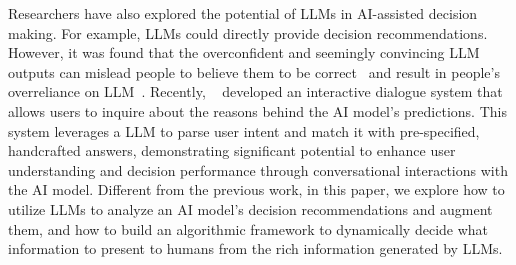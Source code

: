Researchers have also explored the potential of LLMs in AI-assisted decision making. For example, LLMs could directly provide decision recommendations. However, it was found that the 
overconfident and seemingly convincing LLM outputs can mislead people to believe them to be correct~\cite{steyvers2025large} and result in people's overreliance on LLM~\cite{do2024facilitating,kim2024m}. 
Recently, \citeauthor{slack2023explaining}~\cite{slack2023explaining} developed an interactive dialogue system that allows users to inquire about the reasons behind the AI model's predictions. This system leverages a LLM to parse user intent and match it with pre-specified, handcrafted answers, demonstrating significant potential to enhance user understanding and decision performance through conversational interactions with the AI model.
Different from the previous work, %
in this paper, we explore 
how to utilize LLMs to analyze an AI model's decision recommendations and augment them, and 
how to build an algorithmic framework to dynamically decide what information to present to humans from the rich information generated by LLMs.
